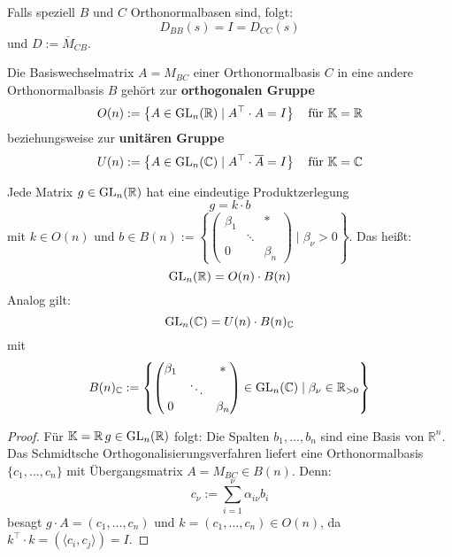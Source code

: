 \documentclass[parskip,a4paper,twoside,DIV15,BCOR12mm]{scrbook}
\begin{document}
Falls speziell \(B\) und \(C\) Orthonormalbasen sind, folgt:
\[
D_{BB}(s)=I=D_{CC}(s)
\]
und \(D:=\overline{M}_{CB}\).
\begin{conclusion}
Die Basiswechselmatrix \(A=M_{BC}\) einer Orthonormalbasis \(C\) in eine andere
Orthonormalbasis \(B\) gehört zur \textbf{orthogonalen Gruppe}
\[
O(n):=\left\{A\in\operatorname{GL}_{n}(\mathbb{R})\mid A^{\top}\cdot A=I\right\}\quad
    \text{für } \mathbb{K}=\mathbb{R}
\]
beziehungsweise zur \textbf{unitären Gruppe}
\[
U(n):=\left\{A\in\operatorname{GL}_{n}(\mathbb{C})\mid A^{\top}\cdot\overline{A}=I\right\}
    \quad\text{für } \mathbb{K}=\mathbb{C}
\]
\end{conclusion}
\begin{comment}
\(O(n)\), beziehungsweise \(U(n)\), ist eine Untergruppe von 
\(\GL_{n}(\mathbb{R})\), beziehungsweise \(\GL_{n}(\mathbb{C})\).
\end{comment}
\begin{conclusion}
Jede Matrix \(g\in\operatorname{GL}_{n}(\mathbb{R})\) hat eine eindeutige Produktzerlegung
\[
g=k\cdot b
\]
mit \(k\in O(n)\) und \(b\in B(n):=\left\{
    \begin{pmatrix}\beta_{1}&&*\\&\ddots&\\0&&\beta_{n}\end{pmatrix}\mid
    \beta_{\nu}>0\right\}\).
Das heißt:
\[
\operatorname{GL}_{n}(\mathbb{R})=O(n)\cdot B(n)
\]
Analog gilt: 
\[
\operatorname{GL}_{n}(\mathbb{C})=U(n)\cdot B(n)_{\mathbb{C}}
\]
mit
\[
B(n)_{\mathbb{C}}:=\left\{
    \begin{pmatrix}\beta_{1}&&*\\&\ddots&\\0&&\beta_{n}\end{pmatrix}\in
	\operatorname{GL}_{n}(\mathbb{C})\mid\beta_{\nu}\in\mathbb{R}_{>0}
    \right\}
\]
\end{conclusion}
\begin{proof}
Für \(\mathbb{K}=\mathbb{R}\,g\in\operatorname{GL}_{n}(\mathbb{R})\) folgt: Die Spalten
\(b_{1},\ldots,b_{n}\) sind eine Basis von \(\mathbb{R}^{n}\).\\
Das Schmidtsche Orthogonalisierungsverfahren liefert eine Orthonormalbasis
\(\{c_{1},\ldots,c_{n}\}\) mit Übergangsmatrix \(A=M_{BC}\in B(n)\). Denn:
\[
c_{\nu}:=\sum_{i=1}^{\nu}{\alpha_{i\nu}b_{i}}
\]
besagt \(g\cdot A=(c_{1},\ldots,c_{n})\) und \(k=(c_{1},\ldots,c_{n})\in O(n)\),
da \(k^{\top}\cdot k=\left(\langle c_{i},c_{j}\rangle\right)=I\).
\end{proof}
\end{document}
